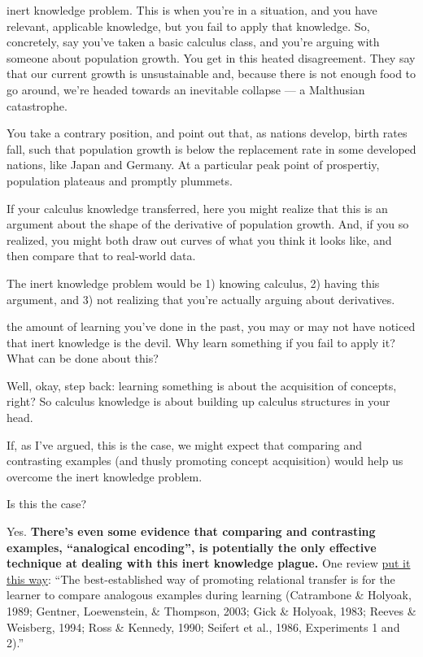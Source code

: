  inert knowledge problem. This is when you're in a
situation, and you have relevant, applicable knowledge, but you fail to
apply that knowledge. So, concretely, say you've taken a basic calculus
class, and you're arguing with someone about population growth. You get
in this heated disagreement. They say that our current growth is
unsustainable and, because there is not enough food to go around, we're headed
towards an inevitable collapse --- a Malthusian catastrophe.

You take a contrary position, and point out that, as nations develop,
birth rates fall, such that population growth is below the replacement
rate in some developed nations, like Japan and Germany. At a particular peak
point of prospertiy, population plateaus and promptly plummets.

If your calculus knowledge transferred, here you might realize that this
is an argument about the shape of the derivative of population growth.
And, if you so realized, you might both draw out curves of what you
think it looks like, and then compare that to real-world data.

The inert knowledge problem would be 1) knowing calculus, 2) having this
argument, and 3) not realizing that you're actually arguing about
derivatives.

 the amount of learning you've done in the past, you
may or may not have noticed that inert knowledge is the devil. Why learn
something if you fail to apply it? What can be done about this?

Well, okay, step back: learning something is about the acquisition of concepts,
right? So calculus knowledge is about building up calculus structures in
your head.

If, as I've argued, this is the case, we might expect that comparing and
contrasting examples (and thusly promoting concept acquisition) would
help us overcome the inert knowledge problem.

Is this the case?

Yes. \textbf{There's even some evidence that comparing and contrasting
examples, ``analogical encoding'', is potentially the only effective
technique at dealing with this inert knowledge plague.} One review
\href{http://onlinelibrary.wiley.com/doi/10.1111/j.1551-6709.2009.01070.x/full}{put
it this way}: ``The best-established way of promoting relational
transfer is for the learner to compare analogous examples during
learning (Catrambone \& Holyoak, 1989; Gentner, Loewenstein, \&
Thompson, 2003; Gick \& Holyoak, 1983; Reeves \& Weisberg, 1994; Ross \&
Kennedy, 1990; Seifert et al., 1986, Experiments 1 and 2).''

